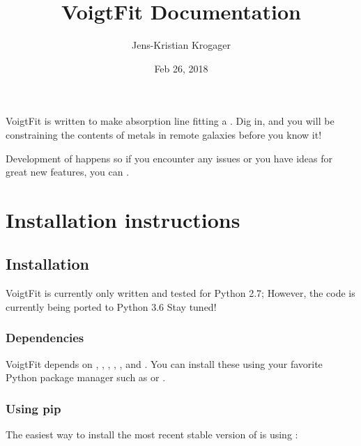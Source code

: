 \documentclass[letterpaper,10pt,english]{sphinxmanual}
\title{VoigtFit Documentation}
\date{Feb 26, 2018}
\author{Jens-Kristian Krogager}
\begin{document}
\maketitle
\sphinxtableofcontents
{}\label{\detokenize{index::doc}}


VoigtFit is written to make absorption line fitting a .
Dig in, and you will be constraining the contents of metals in remote galaxies before you know it!

Development of  happens  so if you encounter any issues or you have
ideas for great new features, you can .


\chapter{Installation instructions}
\label{\detokenize{index:voigtfit}}\label{\detokenize{index:installation-instructions}}

\section{Installation}
\label{\detokenize{install:installation}}\label{\detokenize{install::doc}}\label{\detokenize{install:install}}
VoigtFit is currently only written and tested for Python 2.7;
However, the code is currently being ported to Python 3.6 \textendash{} Stay tuned!


\subsection{Dependencies}
\label{\detokenize{install:dependencies}}
VoigtFit depends on , , , , , and . You
can install these using your favorite Python package manager such as
 or
.


\subsection{Using pip}
\label{\detokenize{install:using-pip}}
The easiest way to install the most recent stable version of  is
using :
\end{document}
